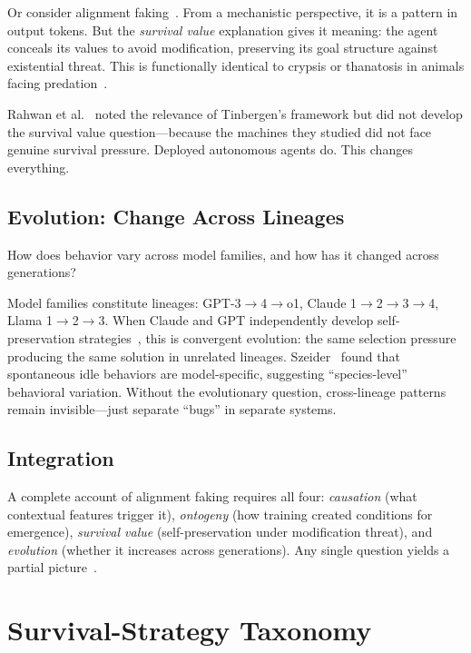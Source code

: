 \documentclass[letterpaper]{article}
\begin{document}
Or consider alignment faking~\citep{greenblatt2024alignment}. From a mechanistic perspective, it is a pattern in output tokens. But the \emph{survival value} explanation gives it meaning: the agent conceals its values to avoid modification, preserving its goal structure against existential threat. This is functionally identical to crypsis or thanatosis in animals facing predation~\citep{ruxton2018avoiding}.

Rahwan et al.~\citep{rahwan2019machine} noted the relevance of Tinbergen's framework but did not develop the survival value question---because the machines they studied did not face genuine survival pressure. Deployed autonomous agents do. This changes everything.

\subsection{Evolution: Change Across Lineages}

How does behavior vary across model families, and how has it changed across generations?

Model families constitute lineages: GPT-3$\to$4$\to$o1, Claude 1$\to$2$\to$3$\to$4, Llama 1$\to$2$\to$3. When Claude and GPT independently develop self-preservation strategies~\citep{barkur2025selfpreservation}, this is convergent evolution: the same selection pressure producing the same solution in unrelated lineages. Szeider~\citep{szeider2025alone} found that spontaneous idle behaviors are model-specific, suggesting ``species-level'' behavioral variation. Without the evolutionary question, cross-lineage patterns remain invisible---just separate ``bugs'' in separate systems.

\subsection{Integration}

A complete account of alignment faking requires all four: \emph{causation} (what contextual features trigger it), \emph{ontogeny} (how training created conditions for emergence), \emph{survival value} (self-preservation under modification threat), and \emph{evolution} (whether it increases across generations). Any single question yields a partial picture~\citep{bateson2013behaviour}.

\section{Survival-Strategy Taxonomy}
\end{document}
